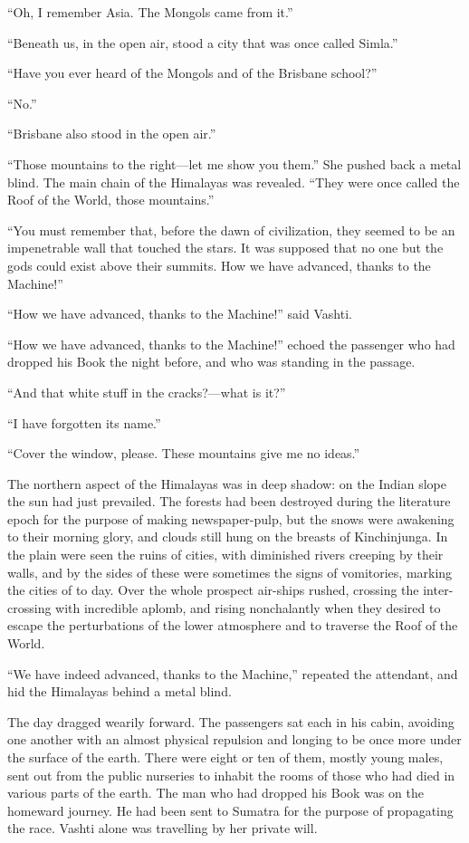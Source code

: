 ``Oh, I remember Asia. The Mongols came from it.''

``Beneath us, in the open air, stood a city that was once called Simla.''

``Have you ever heard of the Mongols and of the Brisbane school?''

``No.''

``Brisbane also stood in the open air.''

``Those mountains to the right---let me show you them.'' She pushed back a metal blind. The main chain of the Himalayas was revealed. ``They were once called the Roof of the World, those mountains.''

``You must remember that, before the dawn of civilization, they seemed to be an impenetrable wall that touched the stars. It was supposed that no one but the gods could exist above their summits. How we have advanced, thanks to the Machine!''

``How we have advanced, thanks to the Machine!'' said Vashti.

``How we have advanced, thanks to the Machine!'' echoed the passenger who had dropped his Book the night before, and who was standing in the passage.

``And that white stuff in the cracks?---what is it?''

``I have forgotten its name.''

``Cover the window, please. These mountains give me no ideas.''

The northern aspect of the Himalayas was in deep shadow: on the Indian slope the sun had just prevailed. The forests had been destroyed during the literature epoch for the purpose of making newspaper-pulp, but the snows were awakening to their morning glory, and clouds still hung on the breasts of Kinchinjunga. In the plain were seen the ruins of cities, with diminished rivers creeping by their walls, and by the sides of these were sometimes the signs of vomitories, marking the cities of to day. Over the whole prospect air-ships rushed, crossing the inter-crossing with incredible aplomb, and rising nonchalantly when they desired to escape the perturbations of the lower atmosphere and to traverse the Roof of the World.

``We have indeed advanced, thanks to the Machine,'' repeated the attendant, and hid the Himalayas behind a metal blind.

The day dragged wearily forward. The passengers sat each in his cabin, avoiding one another with an almost physical repulsion and longing to be once more under the surface of the earth. There were eight or ten of them, mostly young males, sent out from the public nurseries to inhabit the rooms of those who had died in various parts of the earth. The man who had dropped his Book was on the homeward journey. He had been sent to Sumatra for the purpose of propagating the race. Vashti alone was travelling by her private will.


